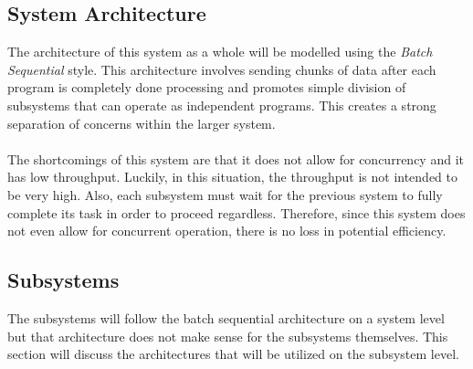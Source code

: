 \documentclass[titlepage]{article}
\begin{document}
\subsection{System Architecture}
The architecture of this system as a whole will be modelled using the \textit{Batch Sequential} style. This architecture involves sending chunks of data after each program is completely done processing and promotes simple division of subsystems that can operate as independent programs. This creates a strong separation of concerns within the larger system.\\~\\
The shortcomings of this system are that it does not allow for concurrency and it has low throughput. Luckily, in this situation, the throughput is not intended to be very high. Also, each subsystem must wait for the previous system to fully complete its task in order to proceed regardless. Therefore, since this system does not even allow for concurrent operation, there is no loss in potential efficiency.
\subsection{Subsystems}
The subsystems will follow the batch sequential architecture on a system level but that architecture does not make sense for the subsystems themselves. This section will discuss the architectures that will be utilized on the subsystem level.
\end{document}
